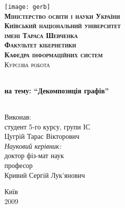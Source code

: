 \begin{titlepage}
  \begin{center}
    
    \texttt{[image: gerb]}\\[.5cm]
    
    \textsc{\large \bfseries {
        Міністерство освіти і науки України\\[0cm]
        Київський національний університет\\імені Тараса Шевченка\\
        Факультет кібернетики\\
        Кафедра інформаційних систем
    }}\\[.5cm]
    \textsc{\LARGE Курсова робота}

    \HRule \\[0.4cm]
           { \huge \bfseries на тему: ``Декомпозиція графів''}\\[0.4cm]
           
           \HRule \\[1cm]

           \begin{flushright}
             Виконав:\\
             студент 5-го курсу, групи ІС\\
             Цугрій Тарас Вікторович\\[1cm]
             \emph{Науковий керівник:}\\
             доктор фіз-мат наук\\
             професор\\
             {К}ривий {С}ергій {Л}ук'янович
           \end{flushright}
           
           \vfill
           
           {\large Київ\\2009}
           
  \end{center}
  
\end{titlepage}
